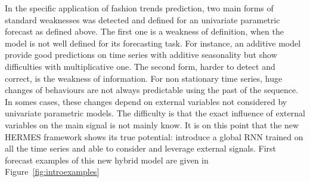 \documentclass{article} %
\begin{document}
In the specific application of fashion trends prediction, two main forms of standard weaknesses was detected and defined for an univariate parametric forecast as defined above. The first one is a weakness of definition, when the model is not well defined for its forecasting task. For instance, an additive model provide good predictions on time series with additive seasonality but show difficulties with multiplicative one. The second form, harder to detect and correct, is the weakness of information. For non stationary time series, huge changes of behaviours are not always predictable using the past of the sequence. In somes cases, these changes depend on external variables not considered by univariate parametric models. The difficulty is that the exact influence of external variables on the main signal is not mainly know. It is on this point that  the new HERMES framework shows its true potential: introduce a global RNN trained on all the time series and able to consider and leverage external signals. First forecast examples of this new hybrid model are given in Figure~\ref{fig:introexamples}

\medskip
\end{document}
